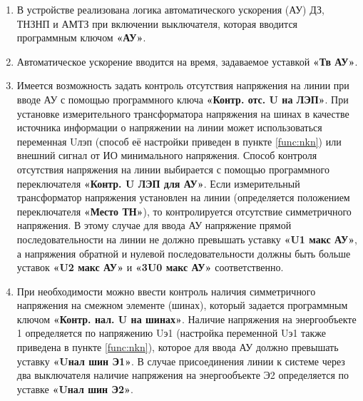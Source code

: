 \color{black}

\begin{enumerate}

\item
В устройстве реализована логика автоматического ускорения (АУ) ДЗ, ТНЗНП и АМТЗ при включении выключателя, которая вводится программным ключом \textbf{«АУ»}.

\item
Автоматическое ускорение вводится на время, задаваемое уставкой \textbf{«Тв АУ»}.

\item
Имеется возможность задать контроль отсутствия напряжения на линии при вводе АУ с помощью программного ключа \textbf{«Контр. отс. U на ЛЭП»}. При установке измерительного трансформатора напряжения на шинах в качестве источника информации о напряжении на линии может использоваться переменная Uлэп (способ её настройки приведен в пункте \ref{func:nkn}) или внешний сигнал от ИО минимального напряжения. Способ контроля отсутствия напряжения на линии выбирается с помощью программного переключателя \textbf{«Контр. U ЛЭП для АУ»}.
Если измерительный трансформатор напряжения установлен на линии (определяется положением переключателя \textbf{«Место ТН»}), то контролируется отсутствие симметричного напряжения. В этому случае для ввода АУ напряжение прямой последовательности на линии не должно превышать уставку \textbf{«U1 макс АУ»}, а напряжения обратной и нулевой последовательности должны быть больше уставок \textbf{«U2 макс АУ»} и \textbf{«3U0 макс АУ»} соответственно.

\item
При необходимости можно ввести контроль наличия симметричного напряжения на смежном элементе (шинах), который задается программным ключом \textbf{«Контр. нал. U на шинах»}. Наличие напряжения на энергообъекте 1 определяется по напряжению Uэ1 (настройка переменной Uэ1 также приведена в пункте \ref{func:nkn}), которое для ввода АУ должно превышать уставку \textbf{«Uнал шин Э1»}. В случае присоединения линии к системе через два выключателя наличие напряжения на энергообъекте Э2 определяется по уставке \textbf{«Uнал шин Э2»}.


\end{enumerate}
